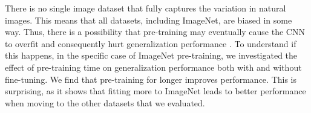 There is no single image dataset that fully captures the variation in natural images. This means that all datasets, including ImageNet, are biased in some way. Thus, there is a possibility that pre-training may eventually cause the CNN to overfit and consequently hurt generalization performance \cite{torralba2011unbiased}. To understand if this happens, in the specific case of ImageNet pre-training, we investigated the effect of pre-training time on generalization performance both with and without fine-tuning. We find that pre-training for longer improves performance. This is surprising, as it shows that fitting more to ImageNet leads to better performance when moving to the other datasets that we evaluated.

